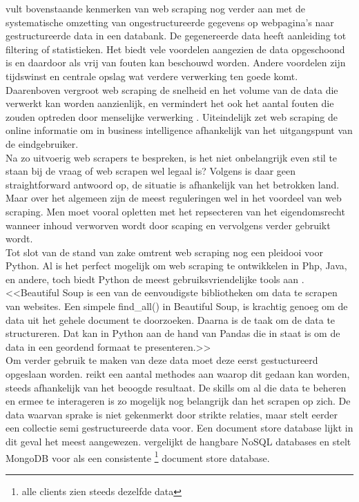 \textcite{Singrodia2019} vult bovenstaande kenmerken van web scraping nog verder aan met de systematische omzetting van ongestructureerde gegevens op webpagina's naar gestructureerde data in een databank. De gegenereerde data heeft aanleiding tot filtering of statistieken. Het biedt vele voordelen aangezien de data opgeschoond is en daardoor als vrij van fouten kan beschouwd worden. Andere voordelen zijn tijdswinst en centrale opslag wat verdere verwerking ten goede komt.\\
Daarenboven vergroot web scraping de snelheid en het volume van de data die verwerkt kan worden aanzienlijk, en vermindert het ook het aantal fouten die zouden optreden door menselijke verwerking \autocite{Bhatt2023}. Uiteindelijk zet web scraping de online informatie om in business intelligence afhankelijk van het uitgangspunt van de eindgebruiker.\\
Na zo uitvoerig web scrapers te bespreken, is het niet onbelangrijk even stil te staan bij de vraag of web scrapen wel legaal is? Volgens \textcite{EPSI2015} is daar geen straightforward antwoord op, de situatie is afhankelijk van het betrokken land. Maar over het algemeen zijn de meest reguleringen wel in het voordeel van web scraping. Men moet vooral opletten met het repsecteren van het eigendomsrecht wanneer inhoud verworven wordt door scaping en vervolgens verder gebruikt wordt.\\
Tot slot van de stand van zake omtrent web scraping nog een pleidooi voor Python. Al is het perfect mogelijk om web scraping te ontwikkelen in Php, Java, en andere, toch biedt Python de meest gebruiksvriendelijke tools aan \textcite{Kumar2023}. <<Beautiful Soup is een van de eenvoudigste bibliotheken om data te scrapen van websites. Een simpele find\_all() in Beautiful Soup, is krachtig genoeg om de data uit het gehele document te doorzoeken. Daarna is de taak om de data te structureren. Dat kan in Python aan de hand van Pandas die in staat is om de data in een geordend formaat te presenteren.>>\\
Om verder gebruik te maken van deze data moet deze eerst gestuctureerd opgeslaan worden. \textcite{Mitchell2015} reikt een aantal methodes aan waarop dit gedaan kan worden, steeds afhankelijk van het beoogde resultaat. De skills om al die data te beheren en ermee te interageren is zo mogelijk nog belangrijk dan het scrapen op zich. De data waarvan sprake is niet gekenmerkt door strikte relaties, maar stelt eerder een collectie semi gestructureerde data voor. Een document store database lijkt in dit geval het meest aangewezen. \textcite{Lourenco2015} vergelijkt de hangbare NoSQL databases en stelt MongoDB voor als een consistente \footnote{alle clients zien steeds dezelfde data} document store database.\\
